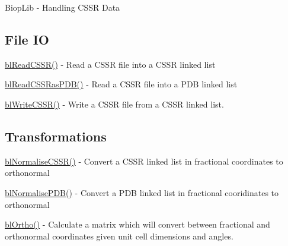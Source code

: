 Biop\-Lib -\/ Handling C\-S\-S\-R Data

\subsection*{File I\-O }


\begin{DoxyItemize}
\item \hyperlink{cssr_8h_abe0c4e2d63f57318b309a5ae55b6aec3}{bl\-Read\-C\-S\-S\-R()} -\/ Read a C\-S\-S\-R file into a C\-S\-S\-R linked list
\item \hyperlink{cssr_8h_aee7acce9da0fc46eab7f6251890b06a7}{bl\-Read\-C\-S\-S\-Ras\-P\-D\-B()} -\/ Read a C\-S\-S\-R file into a P\-D\-B linked list
\item \hyperlink{cssr_8h_aa2c2a7075b5bd05bb631d47a7582ca0b}{bl\-Write\-C\-S\-S\-R()} -\/ Write a C\-S\-S\-R file from a C\-S\-S\-R linked list.
\end{DoxyItemize}

\subsection*{Transformations }


\begin{DoxyItemize}
\item \hyperlink{cssr_8h_a68debd234d6b82467b7f86d07957fb8b}{bl\-Normalise\-C\-S\-S\-R()} -\/ Convert a C\-S\-S\-R linked list in fractional coordinates to orthonormal
\item \hyperlink{cssr_8h_a647b405d5b4a6ef77dd4ca7278e7f282}{bl\-Normalise\-P\-D\-B()} -\/ Convert a P\-D\-B linked list in fractional cooridinates to orthonormal
\item \hyperlink{cssr_8h_a8266255c8dd56c4c05d5268107b4d97a}{bl\-Ortho()} -\/ Calculate a matrix which will convert between fractional and orthonormal coordinates given unit cell dimensions and angles. 
\end{DoxyItemize}